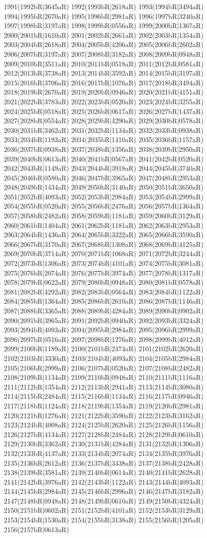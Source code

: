 1991(1992bR|3645aR) 1992(1993bR|2618aR) 1993(1994bR|3494aR) 1994(1995bR|2670aR) 1995(1996bR|2981aR) 1996(1997bR|3240aR) 1997(1998bR|3197aR) 1998(1999bR|0556aR) 1999(2000bR|1367aR) 2000(2001bR|1610aR) 2001(2002bR|2661aR) 2002(2003bR|1354aR) 2003(2004bR|2618aR) 2004(2005bR|4206aR) 2005(2006bR|2602aR) 2006(2007bR|3197aR) 2007(2008bR|3182aR) 2008(2009bR|0948aR) 2009(2010bR|3511aR) 2010(2011bR|0518aR) 2011(2012bR|0581aR) 2012(2013bR|3738aR) 2013(2014bR|3592aR) 2014(2015bR|3197aR) 2015(2016bR|3706aR) 2016(2017bR|1076aR) 2017(2018bR|3494aR) 2018(2019bR|2670aR) 2019(2020bR|0946aR) 2020(2021bR|4151aR) 2021(2022bR|3783aR) 2022(2023bR|0520aR) 2023(2024bR|3255aR) 2024(2025bR|0518aR) 2025(2026bR|0617aR) 2026(2027bR|1437aR) 2027(2028bR|0554aR) 2028(2029bR|4290aR) 2029(2030bR|0578aR) 2030(2031bR|3462aR) 2031(2032bR|1134aR) 2032(2033bR|0938aR) 2033(2034bR|1193aR) 2034(2035bR|1410aR) 2035(2036bR|1157aR) 2036(2037bR|0938aR) 2037(2038bR|1356aR) 2038(2039bR|2950aR) 2039(2040bR|0613aR) 2040(2041bR|0567aR) 2041(2042bR|0520aR) 2042(2043bR|1149aR) 2043(2044bR|3918aR) 2044(2045bR|3740aR) 2045(2046bR|0580aR) 2046(2047bR|3965aR) 2047(2048bR|2953aR) 2048(2049bR|1434aR) 2049(2050bR|3140aR) 2050(2051bR|3650aR) 2051(2052bR|4093aR) 2052(2053bR|2984aR) 2053(2054bR|2999aR) 2054(2055bR|0520aR) 2055(2056bR|2476aR) 2056(2057bR|1364aR) 2057(2058bR|2482aR) 2058(2059bR|1181aR) 2059(2060bR|3129aR) 2060(2061bR|1404aR) 2061(2062bR|1181aR) 2062(2063bR|2953aR) 2063(2064bR|1436aR) 2064(2065bR|3322aR) 2065(2066bR|3590aR) 2066(2067bR|3170aR) 2067(2068bR|1308aR) 2068(2069bR|4125aR) 2069(2070bR|3714aR) 2070(2071bR|1068aR) 2071(2072bR|3244aR) 2072(2073bR|1306aR) 2073(2074bR|4101aR) 2074(2075bR|3081aR) 2075(2076bR|2074aR) 2076(2077bR|3974aR) 2077(2078bR|1317aR) 2078(2079bR|0622aR) 2079(2080bR|0948aR) 2080(2081bR|0578aR) 2081(2082bR|4292aR) 2082(2083bR|0564aR) 2083(2084bR|1122aR) 2084(2085bR|1364aR) 2085(2086bR|2610aR) 2086(2087bR|1146aR) 2087(2088bR|3365aR) 2088(2089bR|4284aR) 2089(2090bR|0902aR) 2090(2091bR|3965aR) 2091(2092bR|0940aR) 2092(2093bR|3324aR) 2093(2094bR|4093aR) 2094(2095bR|2984aR) 2095(2096bR|2999aR) 2096(2097bR|0516aR) 2097(2098bR|1276aR) 2098(2099bR|4012aR) 2099(2100bR|1189aR) 2100(2101bR|2474aR) 2101(2102bR|2620aR) 2102(2103bR|3330aR) 2103(2104bR|4093aR) 2104(2105bR|2984aR) 2105(2106bR|2999aR) 2106(2107bR|0520aR) 2107(2108bR|2482aR) 2108(2109bR|1134aR) 2109(2110bR|0948aR) 2110(2111bR|1116aR) 2111(2112bR|1354aR) 2112(2113bR|2941aR) 2113(2114bR|3080aR) 2114(2115bR|2484aR) 2115(2116bR|1134aR) 2116(2117bR|0946aR) 2117(2118bR|1124aR) 2118(2119bR|1354aR) 2119(2120bR|2981aR) 2120(2121bR|1276aR) 2121(2122bR|3590aR) 2122(2123bR|3162aR) 2123(2124bR|4008aR) 2124(2125bR|2620aR) 2125(2126bR|1156aR) 2126(2127bR|4134aR) 2127(2128bR|2484aR) 2128(2129bR|0610aR) 2129(2130bR|3362aR) 2130(2131bR|4284aR) 2131(2132bR|1306aR) 2132(2133bR|4137aR) 2133(2134bR|2074aR) 2134(2135bR|3976aR) 2135(2136bR|2612aR) 2136(2137bR|3438aR) 2137(2138bR|2428aR) 2138(2139bR|3581aR) 2139(2140bR|0614aR) 2140(2141bR|2628aR) 2141(2142bR|3976aR) 2142(2143bR|1122aR) 2143(2144bR|4093aR) 2144(2145bR|2984aR) 2145(2146bR|2996aR) 2146(2147bR|3182aR) 2147(2148bR|0948aR) 2148(2149bR|0610aR) 2149(2150bR|4324aR) 2150(2151bR|0602aR) 2151(2152bR|4101aR) 2152(2153bR|3129aR) 2153(2154bR|1530aR) 2154(2155bR|3138aR) 2155(2156bR|1205aR) 2156(2157bR|0613aR) 